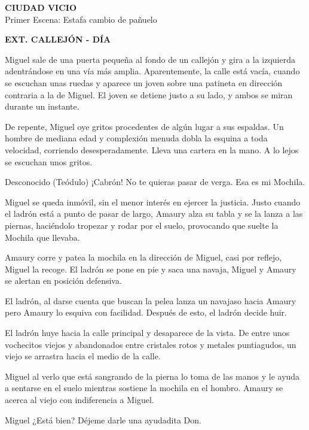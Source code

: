 \begin{center}
    \LARGE \textbf{CIUDAD VICIO}  \\
    \vspace{1em}
    \small Primer Escena: Estafa cambio de pañuelo
\end{center}
\raggedright

\vspace{2em}

\textbf{EXT. CALLEJÓN - DÍA}

\begin{scenedesc}
Miguel sale de una puerta pequeña al fondo de un callejón  y gira a la izquierda adentrándose en una vía más amplia. Aparentemente, la calle está vacía, cuando se escuchan unas ruedas y aparece un joven sobre una patineta en dirección contraria a la de Miguel. El joven se detiene justo a su lado, y ambos se miran durante un instante. 

De repente, Miguel oye gritos procedentes de algún lugar a sus espaldas. Un hombre de mediana edad y complexión menuda dobla la esquina a toda velocidad, corriendo desesperadamente. Lleva una cartera en la mano. A lo lejos se escuchan unos gritos.
\end{scenedesc}

\begin{dialogue}{Desconocido (Teódulo)}
¡Cabrón! No te quieras pasar de verga. Esa es mi Mochila. 
\end{dialogue}

\begin{scenedesc}
Miguel se queda inmóvil, sin el menor interés en ejercer la justicia. Justo cuando el ladrón está a punto de pasar de largo, Amaury alza su tabla y se la lanza a las piernas, haciéndolo tropezar y rodar por el suelo, provocando que suelte la Mochila que llevaba.

Amaury corre y patea la mochila en la dirección de Miguel, casi por reflejo, Miguel la recoge. El ladrón se pone en pie y saca una navaja, Miguel y Amaury se alertan en posición defensiva.

El ladrón, al darse cuenta que buscan la pelea lanza un navajaso hacia Amaury pero Amaury lo esquiva con facilidad. Después de esto, el ladrón decide huir.  
\end{scenedesc}

\begin{scenedesc}
El ladrón huye hacia la calle principal y desaparece de la vista. De entre unos vochecitos viejos y abandonados entre cristales rotos y metales puntiagudos, un viejo se arrastra hacia el medio de la calle. 

Miguel al verlo que está sangrando de la pierna lo toma de las manos y le ayuda a sentarse en el suelo mientras sostiene la mochila en el hombro. Amaury se acerca al viejo con indiferencia a Miguel.  
\end{scenedesc}
\begin{dialogue}{Miguel}
¿Está bien? Déjeme darle una ayudadita Don.
\end{dialogue}

